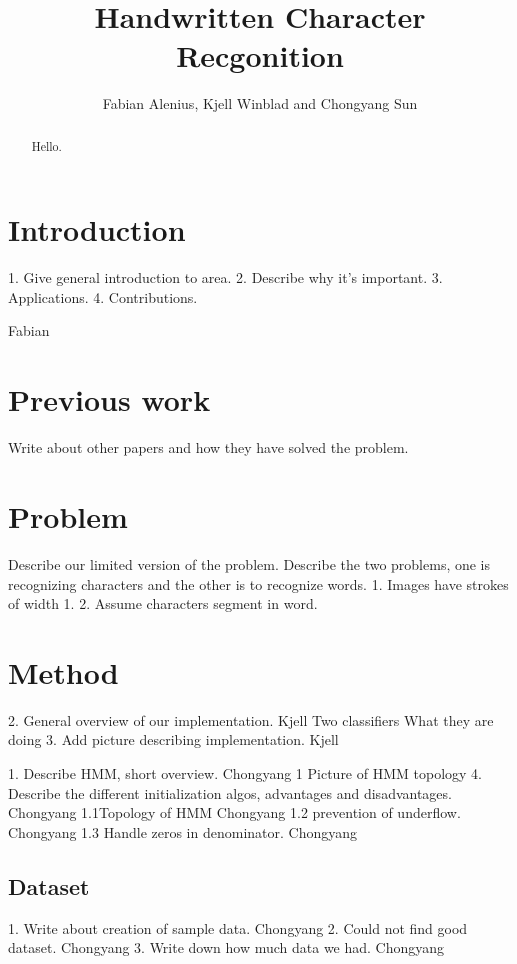 \documentclass[11pt]{article}
\author{Fabian Alenius, Kjell Winblad and Chongyang Sun} \title{Handwritten Character Recgonition}
\begin{document}
\maketitle

\begin{abstract}
Hello.

\end{abstract}

\section{Introduction}
1. Give general introduction to area.
2. Describe why it's important.
3. Applications.
4. Contributions.

\cite{trec}
Fabian


\section{Previous work}
Write about other papers and how they have solved the problem.

\section{Problem}
Describe our limited version of the problem.
Describe the two problems, one is recognizing characters and the other is to recognize words.
1. Images have strokes of width 1.
2. Assume characters segment in word.

\section{Method}\label{sec:method}
2. General overview of our implementation.   Kjell
	Two classifiers
		What they are doing
3. Add picture describing implementation.  Kjell

1. Describe HMM, short overview. Chongyang
1 Picture of HMM topology
4. Describe the different initialization algos, advantages and disadvantages. Chongyang
1.1Topology of HMM Chongyang
1.2 prevention of underflow. Chongyang
1.3 Handle zeros in denominator. Chongyang 




\subsection{Dataset}\label{sec:dataset}
1. Write about creation of sample data. Chongyang
2. Could not find good dataset. Chongyang
3. Write down how much data we had. Chongyang
\end{document}
